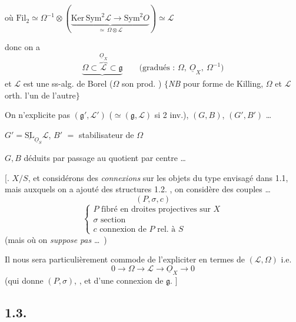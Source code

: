 \documentclass[11pt,a4paper]{article}
\begin{document}
où $\mathrm{Fil}_2 \simeq \Omega^{-1}\otimes(\underbrace{\mathrm{Ker}\,\mathrm{Sym}^2\mathcal{L} \to \mathrm{Sym}^2 O}_{\simeq\ \Omega\otimes\mathcal{L}}) \simeq \mathcal{L}$

donc on a
\[
\underbrace{\Omega \subset \overbrace{\mathcal{L}}^{\underline{O}_X} \subset \mathfrak{g}}_{}
\qquad \text{(gradués : } \Omega,\ \underline{O}_X,\ \Omega^{-1})
\]
et $\mathcal{L}$ est une ss-alg. de Borel ($\Omega$ son prod. ) $\{$\emph{NB} pour forme de Killing, $\Omega$ et $\mathcal{L}$ orth. l'un de l'autre$\}$


On n'explicite pas $(\mathfrak{g}', \mathcal{L}')$ ($\simeq(\mathfrak{g}, \mathcal{L})$ si 2 inv.),  $(G,B)$, $(G',B')$ \ldots

$G' = \underline{\mathrm{SL}}_{\underline{O}_S}\mathcal{L}$, $B'$  $=$ stabilisateur de $\Omega$

$G, B$ déduits par passage au quotient par centre \ldots

[.  $X/S$, et considérons des \emph{connexions}  sur les objets du type envisagé dans 1.1, mais auxquels on a ajouté   des structures 1.2. , on considère des couples \ldots
\[
(P, \sigma, c)
\]
\[
\begin{cases}
P \text{ fibré en droites projectives sur } X\\
\sigma \text{ section}\\
c \text{ connexion de } P \text{ rel. à } S
\end{cases}
\]
(mais où on \emph{suppose} \emph{pas} \ldots\ )

Il nous sera particulièrement commode de l'expliciter en termes de $(\mathcal{L},\Omega)$ i.e.
\[
0 \to \Omega \to \mathcal{L} \to \underline{O}_X \to 0
\]
(qui donne $(P,\sigma)$, , et d'une connexion de $\mathfrak{g}$. ]


\subsection{1.3.}
\end{document}
